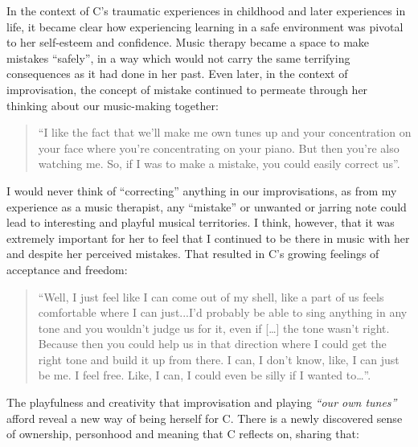 \documentclass[authordate, empirical, issue]{jote-new-article}
\begin{document}
In the context of C's traumatic experiences in childhood and later experiences in life, it became clear how experiencing learning in a safe environment was pivotal to her self-esteem and confidence. Music therapy became a space to make mistakes “safely”, in a way which would not carry the same terrifying consequences as it had done in her past. Even later, in the context of improvisation, the concept of mistake continued to permeate through her thinking about our music-making together:


\begin{quote}
  “I like the fact that we'll make me own tunes up and your concentration on your face where you're concentrating on your piano. But then you're also watching me. So, if I was to make a mistake, you could easily correct us”.
\end{quote}







I would never think of “correcting” anything in our improvisations, as from my experience as a music therapist, any “mistake” or unwanted or jarring note could lead to interesting and playful musical territories. I think, however, that it was extremely important for her to feel that I continued to be there in music with her\emph{ }and despite\emph{ }her perceived mistakes. That resulted in C's growing feelings of acceptance and freedom:\emph{ }







\begin{quote}
  “Well, I just feel like I can come out of my shell, like a part of us feels comfortable where I can just...I'd probably be able to sing anything in any tone and you wouldn't judge us for it, even if […] the tone wasn't right. Because then you could help us in that direction where I could get the right tone and build it up from there. I can, I don't know, like, I can just be me. I feel free. Like, I can, I could even be silly if I wanted to…”.
\end{quote}







The playfulness and creativity that improvisation and playing \emph{“our own tunes”} afford reveal a new way of being herself for C. There is a newly discovered sense of ownership, personhood and meaning that C reflects on, sharing that:
\end{document}
